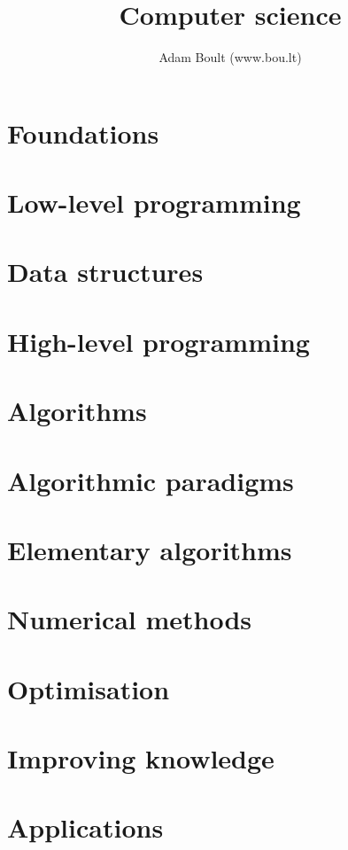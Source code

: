 \documentclass[oneside]{book}
\begin{document}
\author{Adam Boult (www.bou.lt)}
\title{Computer science}
\maketitle

\setcounter{tocdepth}{0}
\tableofcontents



\part{Foundations}





\part{Low-level programming}


\part{Data structures}







\part{High-level programming}




\part{Algorithms}



\part{Algorithmic paradigms}





\part{Elementary algorithms}





\part{Numerical methods}





\part{Optimisation}



\part{Improving knowledge}



\part{Applications}


\end{document}

